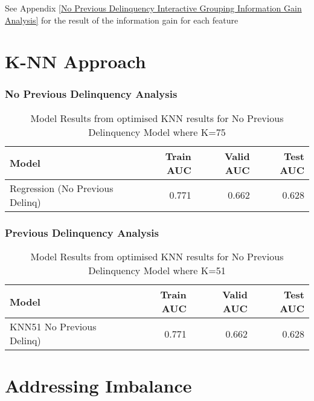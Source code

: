 See Appendix \ref{No Previous Delinquency Interactive Grouping Information Gain Analysis} for the result of the information gain for each feature

\section{K-NN Approach}

\subsubsection{No Previous Delinquency Analysis}




\begin{table}[H]
	\centering
	\begin{tabular}{l | r | r| r}
		\hline
		\textbf{Model} & \textbf{Train AUC} & \textbf{Valid AUC} &  \textbf{Test AUC} \\
		\hline
		Regression (No Previous Delinq) & 0.771 & 0.662 & 0.628  \\
		\hline
	\end{tabular}
	\caption{Model Results from optimised KNN results for No Previous Delinquency Model where K=75}
	\label{table:knnNoPrevDelinqModel}
\end{table}



\subsubsection{Previous Delinquency Analysis}








\begin{table}[H]
	\centering
	\begin{tabular}{l | r | r| r}
		\hline
		\textbf{Model} & \textbf{Train AUC} & \textbf{Valid AUC} &  \textbf{Test AUC} \\
		\hline
		KNN51 No Previous Delinq) & 0.771 & 0.662 & 0.628  \\
		\hline
	\end{tabular}
	\caption{Model Results from optimised KNN results for No Previous Delinquency Model where K=51}
	\label{table:knnNoPrevDelinqModel}
\end{table}


\section{Addressing Imbalance}


